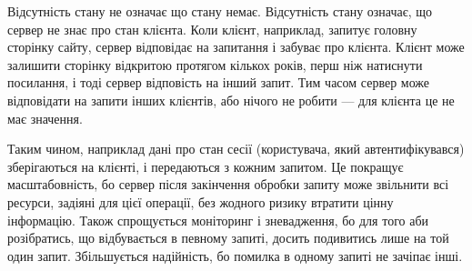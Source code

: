 Відсутність стану не означає що стану немає. Відсутність стану означає, що сервер не знає про стан клієнта. Коли клієнт, наприклад, запитує головну сторінку сайту, сервер відповідає на запитання і забуває про клієнта. Клієнт може залишити сторінку відкритою протягом кількох років, перш ніж натиснути посилання, і тоді сервер відповість на інший запит. Тим часом сервер може відповідати на запити інших клієнтів, або нічого не робити — для клієнта це не має значення.

Таким чином, наприклад дані про стан сесії (користувача, який автентифікувався) зберігаються на клієнті, і передаються з кожним запитом. Це покращує масштабовність, бо сервер після закінчення обробки запиту може звільнити всі ресурси, задіяні для цієї операції, без жодного ризику втратити цінну інформацію. Також спрощується моніторинг і зневадження, бо для того аби розібратись, що відбувається в певному запиті, досить подивитись лише на той один запит. Збільшується надійність, бо помилка в одному запиті не зачіпає інші.